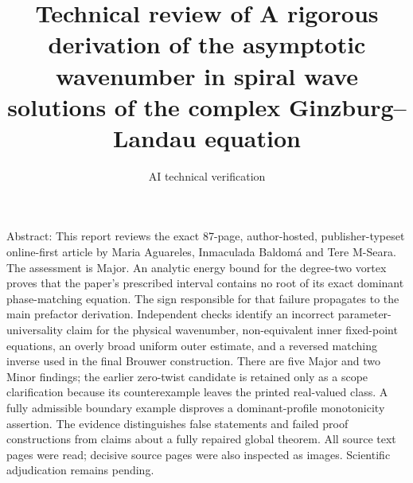\documentclass[10pt]{article}
\title{Technical review of
A rigorous derivation of the asymptotic wavenumber
in spiral wave solutions of the complex
Ginzburg–Landau equation}
\author{AI technical verification}
\date{}
\begin{document}
\maketitle
Abstract: This report reviews the exact 87-page, author-hosted, publisher-typeset online-first article by Maria Aguareles, Inmaculada Baldomá and Tere M-Seara. The assessment is Major. An analytic energy bound for the degree-two vortex proves that the paper’s prescribed interval contains no root of its exact dominant phase-matching equation. The sign responsible for that failure propagates to the main prefactor derivation. Independent checks identify an incorrect parameter-universality claim for the physical wavenumber, non-equivalent inner fixed-point equations, an overly broad uniform outer estimate, and a reversed matching inverse used in the final Brouwer construction. There are five Major and two Minor findings; the earlier zero-twist candidate is retained only as a scope clarification because its counterexample leaves the printed real-valued class. A fully admissible boundary example disproves a dominant-profile monotonicity assertion. The evidence distinguishes false statements and failed proof constructions from claims about a fully repaired global theorem. All source text pages were read; decisive source pages were also inspected as images. Scientific adjudication remains pending.\par
\end{document}
